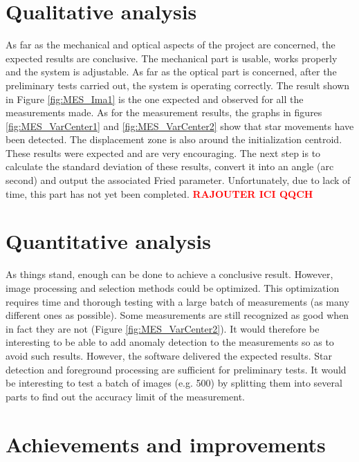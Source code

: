 \section{Qualitative analysis}\label{sec:ANAL_Pos}
As far as the mechanical and optical aspects of the project are concerned, the expected results are conclusive.
The mechanical part is usable, works properly and the system is adjustable.
As far as the optical part is concerned, after the preliminary tests carried out, the system is operating correctly.
The result shown in Figure \ref{fig:MES_Ima1} is the one expected and observed for all the measurements made.
\bigbreak
As for the measurement results, the graphs in figures \ref{fig:MES_VarCenter1} and \ref{fig:MES_VarCenter2} show that star
movements have been detected.
The displacement zone is also around the initialization centroid.
These results were expected and are very encouraging.
\newline
The next step is to calculate the standard deviation of these results, convert it into an angle (arc second) and output the associated
Fried parameter. Unfortunately, due to lack of time, this part has not yet been completed.
\newline
\textbf{\textcolor{red}{RAJOUTER ICI QQCH}}
\section{Quantitative analysis}
As things stand, enough can be done to achieve a conclusive result. However, image processing and selection methods could be optimized.
This optimization requires time and thorough testing with a large batch of measurements (as many different ones as possible).
\newline
Some measurements are still recognized as good when in fact they are not (Figure \ref{fig:MES_VarCenter2}).
It would therefore be interesting to be able to add anomaly detection to the measurements so as to avoid such results. \newline
However, the software delivered the expected results. Star detection and foreground processing are sufficient for preliminary tests.
It would be interesting to test a batch of images (e.g. 500) by splitting them into several parts to find out the accuracy limit
of the measurement.
\newpage
\section{Achievements and improvements}

